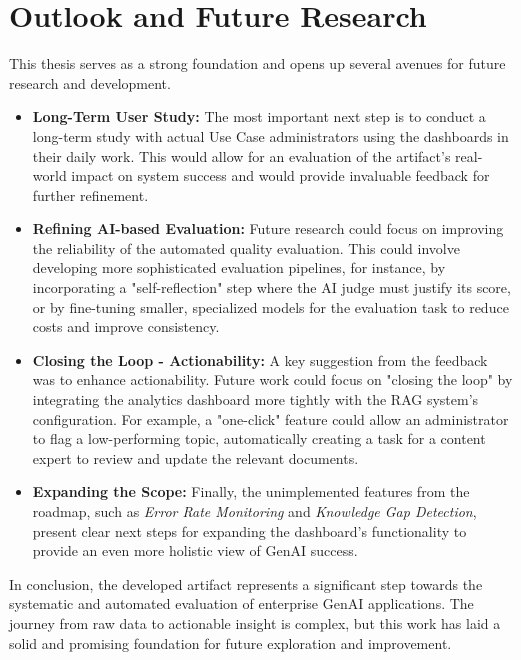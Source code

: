 \documentclass[
	english,
	ruledheaders=section,%
	class=report,%
	thesis={type=bachelor},%
	accentcolor=1b,%
	custommargins=true,%
	marginpar=false,%
	parskip=half-,%
	fontsize=11pt,%
	DIV=14,
]{tudapub}
\begin{document}
\section{Outlook and Future Research}
This thesis serves as a strong foundation and opens up several avenues for future research and development.
\begin{itemize}
    \item \textbf{Long-Term User Study:} The most important next step is to conduct a long-term study with actual Use Case administrators using the dashboards in their daily work. This would allow for an evaluation of the artifact's real-world impact on system success and would provide invaluable feedback for further refinement.
    \item \textbf{Refining AI-based Evaluation:} Future research could focus on improving the reliability of the automated quality evaluation. This could involve developing more sophisticated evaluation pipelines, for instance, by incorporating a "self-reflection" step where the AI judge must justify its score, or by fine-tuning smaller, specialized models for the evaluation task to reduce costs and improve consistency.
    \item \textbf{Closing the Loop - Actionability:} A key suggestion from the feedback was to enhance actionability. Future work could focus on "closing the loop" by integrating the analytics dashboard more tightly with the RAG system's configuration. For example, a "one-click" feature could allow an administrator to flag a low-performing topic, automatically creating a task for a content expert to review and update the relevant documents.
    \item \textbf{Expanding the Scope:} Finally, the unimplemented features from the roadmap, such as \textit{Error Rate Monitoring} and \textit{Knowledge Gap Detection}, present clear next steps for expanding the dashboard's functionality to provide an even more holistic view of GenAI success.
\end{itemize}
In conclusion, the developed artifact represents a significant step towards the systematic and automated evaluation of enterprise GenAI applications. The journey from raw data to actionable insight is complex, but this work has laid a solid and promising foundation for future exploration and improvement.

\end{document}
